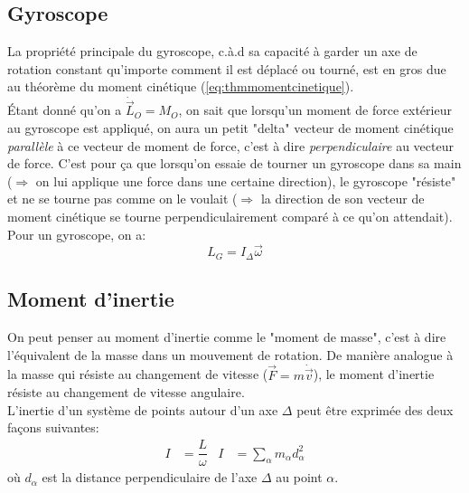 \documentclass{article}
\numberwithin{equation}{section}
\begin{document}
\subsection{Gyroscope}
La propriété principale du gyroscope, c.à.d sa capacité à garder un axe de rotation constant qu'importe comment il est déplacé ou tourné, est en gros due au théorème du moment cinétique (\ref{eq:thmmomentcinetique}). \\

Étant donné qu'on a \( \dot{\vec L}_O = M_O\), on sait que lorsqu'un moment de force extérieur au gyroscope est appliqué, on aura un petit "delta" vecteur de moment cinétique \emph{parallèle} à ce vecteur de moment de force, c'est à dire \emph{perpendiculaire} au vecteur de force. C'est pour ça que lorsqu'on essaie de tourner un gyroscope dans sa main (\(\Rightarrow\) on lui applique une force dans une certaine direction), le gyroscope "résiste" et ne se tourne pas comme on le voulait (\(\Rightarrow\) la direction de son vecteur de moment cinétique se tourne perpendiculairement comparé à ce qu'on attendait). \\

Pour un gyroscope, on a:
\begin{equation}
	L_G = I_\Delta \vec \omega
\end{equation}

\subsection{Moment d'inertie}
On peut penser au moment d'inertie comme le "moment de masse", c'est à dire l'équivalent de la masse dans un mouvement de rotation. De manière analogue à la masse qui résiste au changement de vitesse (\(\vec F = m \dot{\vec v}\)), le moment d'inertie résiste au changement de vitesse angulaire. \\

L'inertie d'un système de points autour d'un axe \(\Delta\) peut être exprimée des deux façons suivantes:
\begin{align*}
	I &= \dfrac{L}{\omega} & I &= \sum_\alpha m_\alpha d_\alpha^2
\end{align*}
où \(d_\alpha\) est la distance perpendiculaire de l'axe \(\Delta\) au point \(\alpha\).
\end{document}
